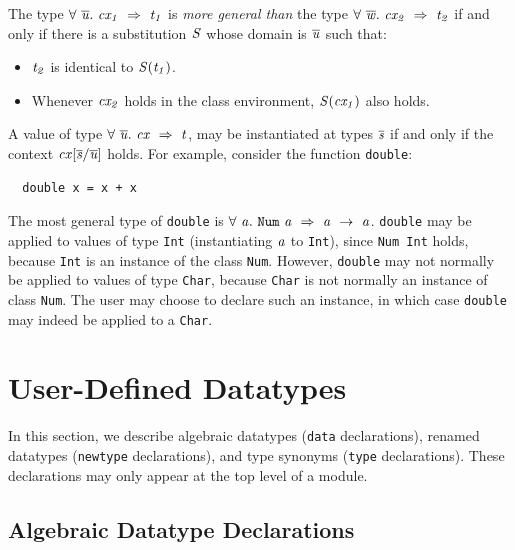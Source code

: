 The type \mbox{$\it \forall\ \overline{u}.~cx_1\ \Rightarrow\ t_1$} is
{\em more general than} the 
type \mbox{$\it \forall\ \overline{w}.~cx_2\ \Rightarrow\ t_2$} if and only if there is 
a substitution \mbox{$\it S$} whose domain is \mbox{$\it \overline{u}$} such that:
\begin{itemize}
\item \mbox{$\it t_2$} is identical to \mbox{$\it S(t_1)$}.
\item Whenever \mbox{$\it cx_2$} holds in the class environment, \mbox{$\it S(cx_1)$} also holds.
\end{itemize}

A value of type
\mbox{$\it \forall\ \overline{u}.~cx\ \Rightarrow\ t$},
may be instantiated at types \mbox{$\it \overline{s}$} if and only if
the context \mbox{$\it cx[\overline{s}/\overline{u}]$} holds.
For example, consider the function \mbox{\tt double}:
\bprog
{\small\begin{verbatim}
  double x = x + x
\end{verbatim}}
\eprog
The most general type of \mbox{\tt double} is
\mbox{$\it \forall\ a.~\makebox{\tt Num}~a\ \Rightarrow\ a\ \rightarrow\ a$}.
\mbox{\tt double} may be applied to values of type \mbox{\tt Int} (instantiating \mbox{$\it a$} to
\mbox{\tt Int}), since \mbox{\tt Num\ Int} holds, because \mbox{\tt Int} is an instance of the class \mbox{\tt Num}.
However, \mbox{\tt double} may not normally be applied to values
of type \mbox{\tt Char}, because \mbox{\tt Char} is not normally an instance of class \mbox{\tt Num}.  The
user may choose to declare such an instance, in which case \mbox{\tt double} may
indeed be applied to a \mbox{\tt Char}.


\section{User-Defined Datatypes}
\label{user-defined-datatypes}

In this section, we describe algebraic datatypes (\mbox{\tt data}
declarations), renamed datatypes (\mbox{\tt newtype} declarations), and type
synonyms (\mbox{\tt type} declarations).  These declarations may only appear at
the top level of a module.

\subsection{Algebraic Datatype Declarations}
\label{datatype-decls}

